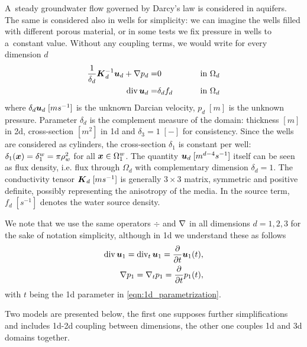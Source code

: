 A~steady groundwater flow governed by Darcy's law is considered in aquifers.
The same is considered also in wells for simplicity:
we can imagine the wells filled with different porous material, or in some tests we fix pressure in wells to a~constant value.
Without any coupling terms, we would write for every dimension $d$
\begin{eqnarray}
     \frac{1}{\delta_d} \mathbf{\boldsymbol{K}}_d^{-1} \mathbf{\boldsymbol{u}}_d + \nabla p_d =& 0  &\qquad \textrm{ in }\Omega_d\\
      {\rm div}\,\mathbf{\boldsymbol{u}}_d  =& \delta_d f_d  &\qquad \textrm{ in }\Omega_d
\end{eqnarray}
where $\delta_d\mathbf{\boldsymbol{u}}_d\; [ms^{-1}]$ is the unknown Darcian velocity, $p_d \; [m]$ is the unknown pressure.
Parameter $\delta_d$ is the complement measure of the domain: thickness $[m]$ in 2d,
cross-section $[m^2]$ in 1d and $\delta_3=1\; [-]$ for consistency. Since the wells are considered as cylinders,
the cross-section $\delta_1$ is constant per well: $\delta_1(\mathbf{\boldsymbol{x}})=\delta^w_1=\pi\rho^2_w$ for all $\mathbf{\boldsymbol{x}}\in \Omega^w_1$.
The quantity $\mathbf{\boldsymbol{u}}_d\; [m^{d-4}s^{-1}]$ itself can be seen as flux density, i.e. flux through $\Omega_d$
with complementary dimension $\delta_d=1$.
The conductivity tensor $\mathbf{\boldsymbol{K}}_d\; [ms^{-1}]$ is generally $3\times 3$ matrix,
symmetric and positive definite, possibly representing the anisotropy of the media.
In the source term, $f_d\;[s^{-1}]$ denotes the water source density.

We note that we use the same operators $\div$ and $\nabla$ in all dimensions $d=1,2,3$ for the sake of notation simplicity,
although in 1d we understand these as follows
\begin{eqnarray}
{\rm div}\,\mathbf{\boldsymbol{u}}_1 = {\rm div}_t\,\mathbf{\boldsymbol{u}}_1 = \frac{\partial}{\partial t} \mathbf{\boldsymbol{u}}_1(t), \\
\nabla p_1 = \nabla_t p_1 = \frac{\partial}{\partial t} p_1(t),
\end{eqnarray}
with $t$ being the 1d parameter in \eqref{eqn:1d_parametrization}.

Two models are presented below, the first one supposes further simplifications and includes 1d-2d coupling between dimensions,
the other one couples 1d and 3d domains together.



